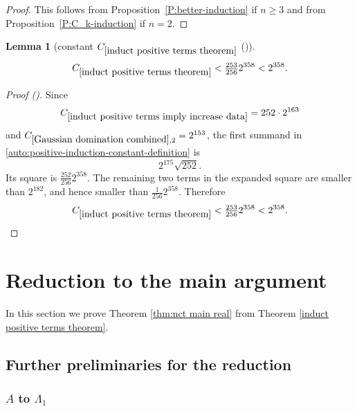 \documentclass[12pt,reqno]{amsart}
\newcommand{\auto}{{({\tiny\faCar})}}
\theoremstyle{plain}
\newtheorem{lemma}[theorem]{Lemma}
\numberwithin{equation}{section}
\theoremstyle{remark}
\newcommand{\uses}[1]{}
\newcommand{\usesdefs}[1]{}
\begin{document}
\begin{proof}
This follows from Proposition~\ref{P:better-induction} if $n\ge 3$ and from Proposition~\ref{P:C_k-induction} if $n=2$.
\end{proof}

\begin{lemma}[constant $C_{\ref{induct positive terms theorem}}$ \auto]\label{constant induct positive terms theorem}\uses{induct positive terms imply increase data,Gaussian domination combined,induct positive terms theorem}\usesdefs{}
\begin{equation}\label{constant induct positive terms theorem bound}
C_{\ref{induct positive terms theorem}}<\tfrac{253}{256}2^{358}<2^{358}.
\end{equation}
\end{lemma}
\begin{proof}[Proof \auto]
Since
\[
C_{\ref{induct positive terms imply increase data}}
=252\cdot2^{163}
\]
and $C_{\ref{Gaussian domination combined},2}=2^{153}$, the first summand in \eqref{auto:positive-induction-constant-definition} is
\[
2^{175}\sqrt{252}.
\]
Its square is $\frac{252}{256}2^{358}$. The remaining two terms in the expanded square are smaller than $2^{182}$, and hence smaller than $\frac1{256}2^{358}$. Therefore
\[
C_{\ref{induct positive terms theorem}}
<\tfrac{253}{256}2^{358}<2^{358}.
\]
\end{proof}


\section{Reduction to the main argument}\label{sec:reduction}
In this section we prove Theorem \ref{thm:nct main real} from Theorem \ref{induct positive terms theorem}.

\subsection{Further preliminaries for the reduction}\label{sec:prelim red}

\subsubsection{\texorpdfstring{$A$ to $\Lambda_1$}{Average to prism form}}
\end{document}
